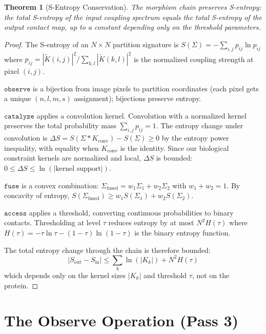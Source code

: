 \documentclass[11pt,twocolumn,a4paper]{article}
\newtheorem{theorem}{Theorem}[section]
\theoremstyle{definition}
\theoremstyle{remark}
\newcommand{\Sig}{\Sigma}
\newcommand{\Ktilde}{\tilde{K}}
\begin{document}
\begin{theorem}[S-Entropy Conservation]
\label{thm:s_entropy_conservation}
The morphism chain preserves S-entropy: the total S-entropy of the input coupling spectrum equals the total S-entropy of the output contact map, up to a constant depending only on the threshold parameters.
\end{theorem}

\begin{proof}
The S-entropy of an $N \times N$ partition signature is $S(\Sig) = -\sum_{i,j} p_{ij} \ln p_{ij}$ where $p_{ij} = |\Ktilde(i,j)|^2 / \sum_{k,l} |\Ktilde(k,l)|^2$ is the normalized coupling strength at pixel $(i,j)$.

$\texttt{observe}$ is a bijection from image pixels to partition coordinates (each pixel gets a unique $(n,l,m,s)$ assignment); bijections preserve entropy.

$\texttt{catalyze}$ applies a convolution kernel. Convolution with a normalized kernel preserves the total probability mass $\sum_{i,j} p_{ij} = 1$. The entropy change under convolution is $\Delta S = S(\Sig * K_{\text{conv}}) - S(\Sig) \geq 0$ by the entropy power inequality, with equality when $K_{\text{conv}}$ is the identity. Since our biological constraint kernels are normalized and local, $\Delta S$ is bounded: $0 \leq \Delta S \leq \ln(|\text{kernel support}|)$.

$\texttt{fuse}$ is a convex combination: $\Sig_{\text{fused}} = w_1 \Sig_1 + w_2 \Sig_2$ with $w_1 + w_2 = 1$. By concavity of entropy, $S(\Sig_{\text{fused}}) \geq w_1 S(\Sig_1) + w_2 S(\Sig_2)$.

$\texttt{access}$ applies a threshold, converting continuous probabilities to binary contacts. Thresholding at level $\tau$ reduces entropy by at most $N^2 H(\tau)$ where $H(\tau) = -\tau \ln \tau - (1-\tau) \ln(1-\tau)$ is the binary entropy function.

The total entropy change through the chain is therefore bounded:
\begin{equation}
|S_{\text{out}} - S_{\text{in}}| \leq \sum_k \ln(|K_k|) + N^2 H(\tau)
\end{equation}
which depends only on the kernel sizes $|K_k|$ and threshold $\tau$, not on the protein.
\end{proof}

\section{The Observe Operation (Pass 3)}
\label{sec:observe}
\end{document}
